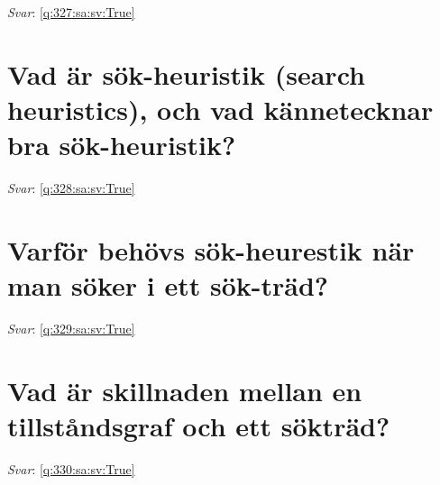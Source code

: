 \documentclass[a4paper,11pt,oneside]{book}
\begin{document}
\begin{sloppypar}
\label{q:327:sa:sv:False}

\vspace{2cm}

\noindent\makebox[\textwidth]{\hrulefill}

\vspace{1cm}

\textit{Svar}: \autoref{q:327:sa:sv:True}



\section{Vad \"ar s\"ok-heuristik (search heuristics), och vad k\"annetecknar bra s\"ok-heuristik?}

\label{q:328:sa:sv:False}

\vspace{2cm}

\noindent\makebox[\textwidth]{\hrulefill}

\vspace{1cm}

\textit{Svar}: \autoref{q:328:sa:sv:True}



\section{Varf\"or beh\"ovs s\"ok-heurestik n\"ar man s\"oker i ett s\"ok-tr\"ad?}

\label{q:329:sa:sv:False}

\vspace{2cm}

\noindent\makebox[\textwidth]{\hrulefill}

\vspace{1cm}

\textit{Svar}: \autoref{q:329:sa:sv:True}



\section{Vad \"ar skillnaden mellan en tillst\r{a}ndsgraf och ett s\"oktr\"ad?}

\label{q:330:sa:sv:False}

\vspace{2cm}

\noindent\makebox[\textwidth]{\hrulefill}

\vspace{1cm}

\textit{Svar}: \autoref{q:330:sa:sv:True}




\end{sloppypar}
\end{document}
